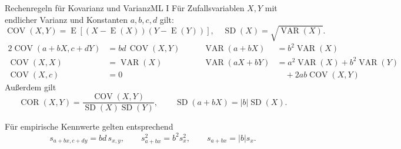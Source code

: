 \begin{formulaBox}{Rechenregeln für Kovarianz und Varianz}{ML I}
Für Zufallsvariablen $X, Y$ mit endlicher Varianz und Konstanten $a, b, c, d$ gilt:
\[
\operatorname{COV}(X, Y)=\operatorname{E}\!\left[(X-\operatorname{E}(X))(Y-\operatorname{E}(Y))\right],\quad
\operatorname{SD}(X)=\sqrt{\operatorname{VAR}(X)}.
\]
\begin{alignat*}{2}
\operatorname{COV}(a+bX, c+dY)
  &= bd\,\operatorname{COV}(X, Y)
  &\qquad \operatorname{VAR}(a+bX)
  &= b^2\operatorname{VAR}(X)\\
\operatorname{COV}(X, X)
  &= \operatorname{VAR}(X)
  &\qquad \operatorname{VAR}(aX+bY)
  &= a^2\operatorname{VAR}(X)+b^2\operatorname{VAR}(Y)\\
\operatorname{COV}(X, c)
  &=0
  &
  &\quad+2ab\operatorname{COV}(X, Y)
\end{alignat*}
Außerdem gilt
\[
\operatorname{COR}(X, Y)
=\frac{\operatorname{COV}(X, Y)}
{\operatorname{SD}(X)\operatorname{SD}(Y)},
\qquad
\operatorname{SD}(a+bX)=|b|\operatorname{SD}(X).
\]

Für empirische Kennwerte gelten entsprechend
\[
s_{a+bx, c+dy}=bd\,s_{x, y},\qquad
s_{a+bx}^2=b^2s_x^2,\qquad
s_{a+bx}=|b|s_x.
\]
\end{formulaBox}

